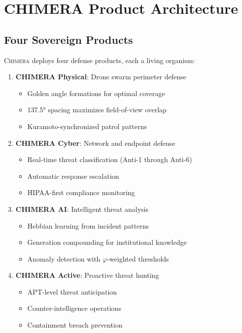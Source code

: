 \documentclass[12pt]{article}
\newcommand{\PHI}{\varphi}
\newcommand{\CHIMERA}{\textsc{Chimera}}
\begin{document}
\section{CHIMERA Product Architecture}
\label{sec:products}

\subsection{Four Sovereign Products}

\CHIMERA{} deploys four defense products, each a living organism:

\begin{enumerate}
  \item \textbf{CHIMERA Physical}: Drone swarm perimeter defense
  \begin{itemize}[nosep]
    \item Golden angle formations for optimal coverage
    \item 137.5° spacing maximizes field-of-view overlap
    \item Kuramoto-synchronized patrol patterns
  \end{itemize}
  
  \item \textbf{CHIMERA Cyber}: Network and endpoint defense
  \begin{itemize}[nosep]
    \item Real-time threat classification (Anti-1 through Anti-6)
    \item Automatic response escalation
    \item HIPAA-first compliance monitoring
  \end{itemize}
  
  \item \textbf{CHIMERA AI}: Intelligent threat analysis
  \begin{itemize}[nosep]
    \item Hebbian learning from incident patterns
    \item Generation compounding for institutional knowledge
    \item Anomaly detection with $\PHI$-weighted thresholds
  \end{itemize}
  
  \item \textbf{CHIMERA Active}: Proactive threat hunting
  \begin{itemize}[nosep]
    \item APT-level threat anticipation
    \item Counter-intelligence operations
    \item Containment breach prevention
  \end{itemize}
\end{enumerate}
\end{document}
